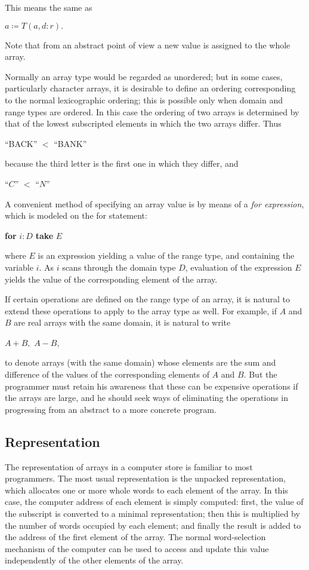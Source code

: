 \noindent
This means the same as

\quad $a\coloneq T(a, d:r).$

\noindent
Note that from an abstract point of view a new value is assigned to the whole array.

Normally an array type would be regarded as unordered; but in some cases, particularly character arrays, it is desirable to define an ordering corresponding to the normal lexicographic ordering; this is possible only when domain and range types are ordered. In this case the ordering of two arrays is determined by that of the lowest subscripted elements in which the two arrays differ. Thus

\quad ``BACK'' $<$ ``BANK''

\noindent
because the third letter is the first one in which they differ, and

\quad ``$C$'' $<$ ``$N$''

A convenient method of specifying an array value is by means of a \textit{for expression}, which is modeled on the for statement:

\quad \textbf{for} $i:D$ \textbf{take} $E$

\noindent
where $E$ is an expression yielding a value of the range type, and containing the variable $i$. As $i$ scans through the domain type $D$, evaluation of the expression $E$ yields the value of the corresponding element of the array.

If certain operations are defined on the range type of an array, it is natural to extend these operations to apply to the array type as well. For example, if $A$ and $B$ are real arrays with the same domain, it is natural to write

\quad $A + B,$ $A - B$,

to denote arrays (with the same domain) whose elements are the sum and difference of the values of the corresponding elements of $A$ and $B$. But the programmer must retain his awareness that these can be expensive operations if the arrays are large, and he should seek ways of eliminating the operations in progressing from an abstract to a more concrete program.

\subsection{Representation}
\label{sec:representation-6.2}

The representation of arrays in a computer store is familiar to most programmers. The most usual representation is the unpacked representation, which allocates one or more whole words to each element of the array. In this case, the computer address of each element is simply computed: first, the value of the subscript is converted to a minimal representation; then this is multiplied by the number of words occupied by each element; and finally the result is added to the address of the first element of the array. The normal word-selection mechanism of the computer can be used to access and update this value independently of the other elements of the array.

